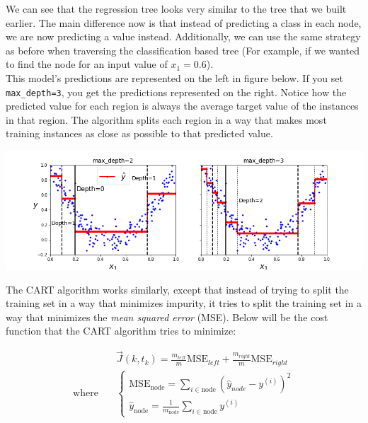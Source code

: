\noindent
We can see that the regression tree looks very similar to the tree that we built earlier. The main difference now is that instead of predicting 
a class in each node, we are now predicting a value instead. Additionally, we can use the same strategy as before when traversing the 
classification based tree (For example, if we wanted to find the node for an input value of $x_{1} = 0.6$). \\

\noindent
This model’s predictions are represented on the left in figure below. If you set \texttt{max_depth=3}, you get the predictions 
represented on the right. Notice how the predicted value for each region is always the average target value of the instances in that region. 
The algorithm splits each region in a way that makes most training instances as close as possible to that predicted value.

\begin{center}
\includegraphics[scale=0.45]{Images/tree_regression_plot.png}
\end{center}

\noindent
The CART algorithm works similarly, except that instead of trying to split the training set in a way that minimizes impurity, it tries to split
the training set in a way that minimizes the \textit{mean squared error} (MSE). Below will be the cost function that the CART algorithm tries
to minimize:

\begin{equation*}   
\begin{aligned}
    \quad & \vec{J}(k, t_{k}) = \frac{m_{left}}{m} \text{MSE}_{left} + \frac{m_{right}}{m} \text{MSE}_{right}\\
\textrm{where} \quad & 
\begin{cases} 
    \text{MSE}_{\text{node}} = \sum_{i \in \text{node}} \left(\hat{y}_{node} - y^{(i)}\right)^{2} \\
    \hat{y}_{\text{node}} = \frac{1}{m_{\text{node}}} \sum_{i \in \text{node}} y^{(i)}
\end{cases}
\end{aligned}
\end{equation*}


